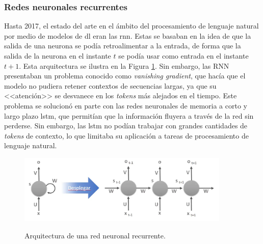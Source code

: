 \subsubsection{Redes neuronales recurrentes}
Hasta 2017, el estado del arte en el ámbito del procesamiento de lenguaje natural por medio de modelos de \gls{dl} eran las \gls{rnn}. Estas se basaban en la idea de que la salida de una neurona se podía retroalimentar a la entrada, de forma que la salida de la neurona en el instante $t$ se podía usar como entrada en el instante $t+1$. Esta arquitectura se ilustra en la Figura \ref{fig:red_neuronal_recurrente}. Sin embargo, las RNN presentaban un problema conocido como \emph{vanishing gradient}, que hacía que el modelo no pudiera retener contextos de secuencias largas, ya que su <<atención>> se desvanece en los \emph{tokens} más alejados en el tiempo. Este problema se solucionó en parte con las redes neuronales de memoria a corto y largo plazo \gls{lstm}, que permitían que la información fluyera a través de la red sin perderse. Sin embargo, las \gls{lstm} no podían trabajar con grandes cantidades de \emph{tokens} de contexto, lo que limitaba su aplicación a tareas de procesamiento de lenguaje natural.

\begin{figure}[H]
    \caption[Arquitectura de una red neuronal recurrente]{Arquitectura de una red neuronal recurrente.}
    \centering
    \includegraphics[width=0.9\textwidth]{./figuras/red_neuronal_recurrente.png}
    \label{fig:red_neuronal_recurrente}
\end{figure}


